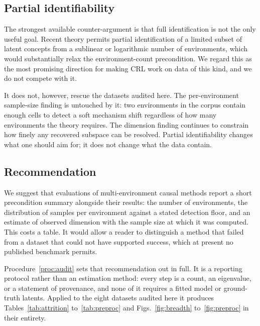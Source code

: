 \documentclass[journal,twoside,web]{ieeecolor}
\begin{document}
\subsection{Partial identifiability}
The strongest available counter-argument is that full identification is not
the only useful goal. Recent theory permits partial identification of a
limited subset of latent concepts from a sublinear or logarithmic number of
environments, which would substantially relax the environment-count
precondition. We regard this as the most promising direction for making CRL
work on data of this kind, and we do not compete with it.

It does not, however, rescue the datasets audited here. The per-environment
sample-size finding is untouched by it: two environments in the corpus contain
enough cells to detect a soft mechanism shift regardless of how many
environments the theory requires. The dimension finding continues to constrain
how finely any recovered subspace can be resolved. Partial identifiability
changes what one should aim for; it does not change what the data contain.

\subsection{Recommendation}
We suggest that evaluations of multi-environment causal methods report a short
precondition summary alongside their results: the number of environments, the
distribution of samples per environment against a stated detection floor, and
an estimate of observed dimension with the sample size at which it was
computed. This costs a table. It would allow a reader to distinguish a method
that failed from a dataset that could not have supported success, which at
present no published benchmark permits.

Procedure~\ref{proc:audit} sets that recommendation out in full. It is a
reporting protocol rather than an estimation method: every step is a count, an
eigenvalue, or a statement of provenance, and none of it requires a fitted
model or ground-truth latents. Applied to the eight datasets audited here it
produces Tables~\ref{tab:attrition} to~\ref{tab:preproc} and
Figs.~\ref{fig:breadth} to~\ref{fig:preproc} in their entirety.
\end{document}

